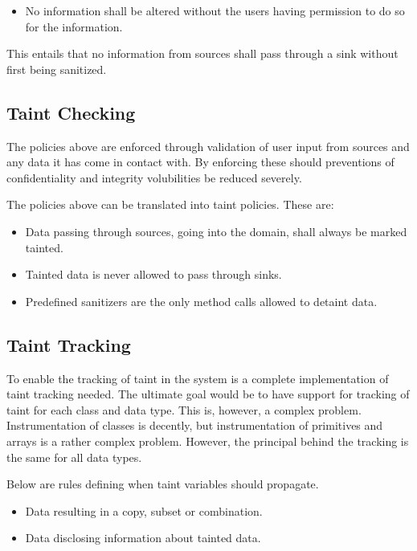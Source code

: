 \begin{itemize}
    \item No information shall be altered without the users having permission to do so for the information.
\end{itemize}
\hfill

This entails that no information from sources shall pass through a sink without first being sanitized.



\subsection{Taint Checking}
The policies above are enforced through validation of user input from sources and any data it has come in contact with. By enforcing these should preventions of confidentiality and integrity volubilities be reduced severely.

The policies above can be translated into taint policies. These are:

\begin{itemize}
    \item Data passing through sources, going into the domain, shall always be marked tainted.
    \item Tainted data is never allowed to pass through sinks.
    \item Predefined sanitizers are the only method calls allowed to detaint data.
\end{itemize}
\hfill



\subsection{Taint Tracking}
To enable the tracking of taint in the system is a complete implementation of taint tracking needed. The ultimate goal would be to have support for tracking of taint for each class and data type. This is, however, a complex problem. Instrumentation of classes is decently, but instrumentation of primitives and arrays is a rather complex problem. However, the principal behind the tracking is the same for all data types. 

Below are rules defining when taint variables should propagate.

\begin{itemize}
    \item Data resulting in a copy, subset or combination.
    \item Data disclosing information about tainted data.
\end{itemize}
\hfill



